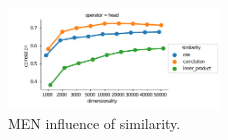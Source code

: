 \begin{figure}[h]
  \centering

  \includegraphics[width=0.5\textwidth]{supplement/figures/men-interaction-similarity}

  \caption{MEN influence of similarity.}
  \label{fig:men-similarity}
\end{figure}
